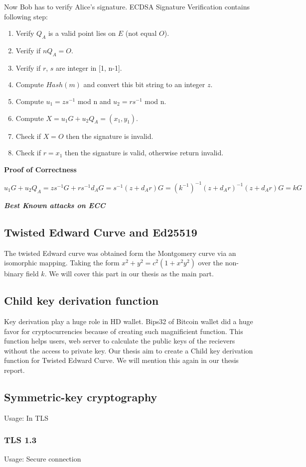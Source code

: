 Now Bob has to verify Alice's signature. ECDSA Signature Verification contains following step:
\begin{enumerate}
  \item Verify $Q_A$ is a valid point lies on $E$ (not equal $O$).
  \item Verify if $nQ_A = O$.
  \item Verify if $r$, $s$ are integer in [1, n-1].
  \item Compute $Hash(m)$ and convert this bit string to an integer $z$.
  \item Compute $u_1=zs^{-1}$ mod n and $u_2= rs^{-1}$ mod n.
  \item Compute $X = u_1G + u_2Q_A = (x_1, y_1)$.
  \item Check if $X = O$ then the signature is invalid.
  \item Check if $r = x_1$ then the signature is valid, otherwise return invalid.
\end{enumerate}

{\textbf{Proof of Correctness}}

$u_1G + u_2Q_A = zs^{-1}G + rs^{-1}d_AG = s^{-1}(z+d_Ar)G =(k^{-1})^{-1}(z+d_Ar)^{-1}(z+d_Ar)G = kG$

\bigskip
{\textit {\textbf{Best Known attacks on ECC}}}

\subsection{Twisted Edward Curve and Ed25519}
The twisted Edward curve was obtained form the Montgomery curve via an isomorphic mapping.
Taking the form $x^2 + y^2 = c^2(1+ x^2y^2)$ over the non-binary field $k$.
We will cover this part in our thesis as the main part.

\subsection{Child key derivation function}
Key derivation play a huge role in HD wallet.
Bips32 of Bitcoin wallet did a huge favor for cryptocurrencies because of creating such magnificient function.
This function helps users, web server to calculate the public keys of the recievers without the access to private key.
Our thesis aim to create a Child key derivation function for Twisted Edward Curve.
We will mention this again in our thesis report.

\subsection{Symmetric-key cryptography}
\label{sec: Symmetric_keys}
Usage: In TLS

\subsubsection{TLS 1.3}
Usage: Secure connection



